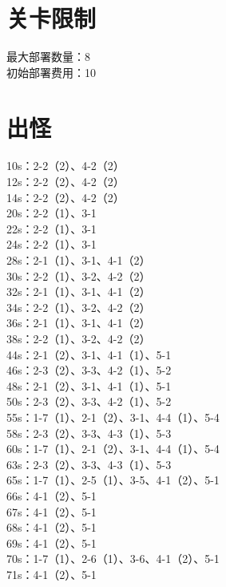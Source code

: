 \documentclass[a4paper,12pt]{article}
\begin{document}
	\section{关卡限制}
		最大部署数量：8\\
		\indent 初始部署费用：10
	\section{出怪}
		10s：2-2（2）、4-2（2）\\
		\indent 12s：2-2（2）、4-2（2）\\
		\indent 14s：2-2（2）、4-2（2）\\
		\indent 20s：2-2（1）、3-1\\
		\indent 22s：2-2（1）、3-1\\
		\indent 24s：2-2（1）、3-1\\
		\indent 28s：2-1（1）、3-1、4-1（2）\\
		\indent 30s：2-2（1）、3-2、4-2（2）\\
		\indent 32s：2-1（1）、3-1、4-1（2）\\
		\indent 34s：2-2（1）、3-2、4-2（2）\\
		\indent 36s：2-1（1）、3-1、4-1（2）\\
		\indent 38s：2-2（1）、3-2、4-2（2）\\
		\indent 44s：2-1（2）、3-1、4-1（1）、5-1\\
		\indent 46s：2-3（2）、3-3、4-2（1）、5-2\\
		\indent 48s：2-1（2）、3-1、4-1（1）、5-1\\
		\indent 50s：2-3（2）、3-3、4-2（1）、5-2\\
		\indent 55s：1-7（1）、2-1（2）、3-1、4-4（1）、5-4\\
		\indent 58s：2-3（2）、3-3、4-3（1）、5-3\\
		\indent 60s：1-7（1）、2-1（2）、3-1、4-4（1）、5-4\\
		\indent 63s：2-3（2）、3-3、4-3（1）、5-3\\
		\indent 65s：1-7（1）、2-5（1）、3-5、4-1（2）、5-1\\
		\indent 66s：4-1（2）、5-1\\
		\indent 67s：4-1（2）、5-1\\
		\indent 68s：4-1（2）、5-1\\
		\indent 69s：4-1（2）、5-1\\
		\indent 70s：1-7（1）、2-6（1）、3-6、4-1（2）、5-1\\
		\indent 71s：4-1（2）、5-1\\
\end{document}
